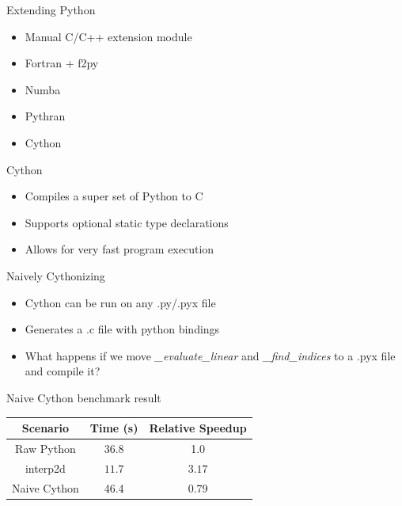\documentclass[12pt,xcolor=dvipsnames]{beamer}
\begin{document}
    \begin{frame}{Extending Python}
        \begin{itemize}
            \item Manual C/C++ extension module
            \item Fortran + f2py
            \item Numba
            \item Pythran
            \item Cython
        \end{itemize}
    \end{frame}

    \begin{frame}{Cython}
        \begin{itemize}
            \item Compiles a super set of Python to C
            \item Supports optional static type declarations
            \item Allows for very fast program execution
        \end{itemize}
    \end{frame}

    \begin{frame}{Naively Cythonizing}
        \begin{itemize}
            \item Cython can be run on any .py/.pyx file
            \item Generates a .c file with python bindings
            \item What happens if we move \textit{\_evaluate\_linear} and \textit{\_find\_indices} to a .pyx file and compile it?
        \end{itemize}
    \end{frame}

    \begin{frame}{Naive Cython benchmark result}
        \begin{center}
        \begin{tabular}{ | c | c | c | }
            \hline
            Scenario & Time (s) & Relative Speedup \\
            \hline
            Raw Python & 36.8 & 1.0 \\
            interp2d & $11.7$ & $3.17$ \\
            Naive Cython & 46.4 & 0.79 \\
            \hline
        \end{tabular}
        \end{center}
    \end{frame}
\end{document}
